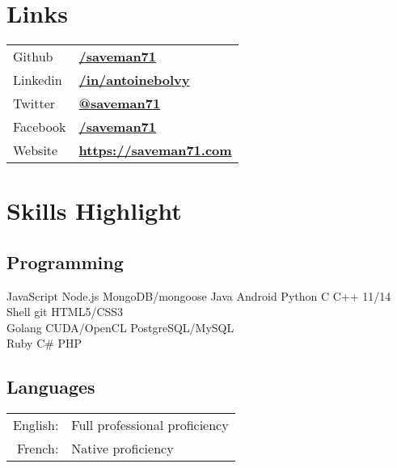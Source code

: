 \documentclass[
  english,
  a4paper
]{resume-openfont}
\begin{document}
\noindent%
\begin{minipage}[t]{0.31\textwidth}



\section{Links}
\begin{tabular}{@{}l@{\hskip 0.5em}l}
Github & \href{https://github.com/saveman71}{\bf /saveman71} \\
Linkedin & \href{https://www.linkedin.com/in/antoinebolvy}{\bf /in/antoinebolvy} \\
Twitter & \href{https://twitter.com/saveman71}{\bf @saveman71} \\
Facebook & \href{https://facebook.com/saveman71}{\bf /saveman71} \\
Website & \href{https://saveman71.com}{\bf https://saveman71.com} \\
\end{tabular}
\sectionsep


\section{Skills Highlight}
\subsection{Programming}
\vspace{2pt}
JavaScript \textbullet{} Node.js \textbullet{} MongoDB/mongoose \textbullet{} Java \textbullet{} Android \textbullet{} Python \textbullet{} C \textbullet{} C++ 11/14 \textbullet{} Shell \textbullet{}  \textbullet{} git \textbullet{} HTML5/CSS3\\
Golang \textbullet{} CUDA/OpenCL \textbullet{} PostgreSQL/MySQL\\
Ruby \textbullet{} C\# \textbullet{} PHP\\
\sectionsep

\subsection{Languages}
\vspace{2pt}
\begin{tabular}{@{}r@{\hskip 0.5em}l}
English: &Full professional proficiency \\
French: &Native proficiency
\end{tabular}
\sectionsep


\end{minipage}
\end{document}
